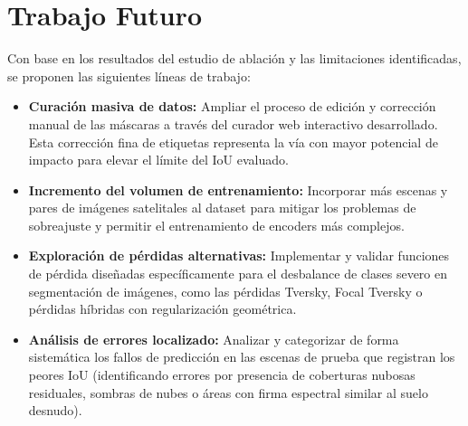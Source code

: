 \documentclass{article}
\begin{document}
\section{Trabajo Futuro}
Con base en los resultados del estudio de ablación y las limitaciones identificadas, se proponen las siguientes líneas de trabajo:
\begin{itemize}
    \item \textbf{Curación masiva de datos:} Ampliar el proceso de edición y corrección manual de las máscaras a través del curador web interactivo desarrollado. Esta corrección fina de etiquetas representa la vía con mayor potencial de impacto para elevar el límite del IoU evaluado.
    \item \textbf{Incremento del volumen de entrenamiento:} Incorporar más escenas y pares de imágenes satelitales al dataset para mitigar los problemas de sobreajuste y permitir el entrenamiento de encoders más complejos.
    \item \textbf{Exploración de pérdidas alternativas:} Implementar y validar funciones de pérdida diseñadas específicamente para el desbalance de clases severo en segmentación de imágenes, como las pérdidas Tversky, Focal Tversky o pérdidas híbridas con regularización geométrica.
    \item \textbf{Análisis de errores localizado:} Analizar y categorizar de forma sistemática los fallos de predicción en las escenas de prueba que registran los peores IoU (identificando errores por presencia de coberturas nubosas residuales, sombras de nubes o áreas con firma espectral similar al suelo desnudo).
\end{itemize}
\end{document}
